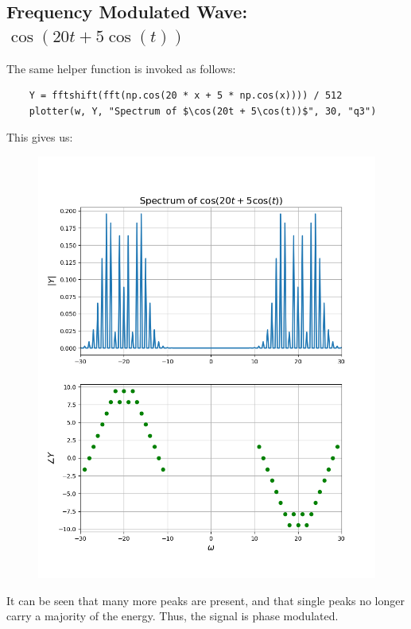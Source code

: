 \documentclass[12pt, a4paper]{article}
\begin{document}
\subsection{Frequency Modulated Wave: $\cos(20t + 5\cos(t))$}
The same helper function is invoked as follows:
\begin{lstlisting}
    Y = fftshift(fft(np.cos(20 * x + 5 * np.cos(x)))) / 512
    plotter(w, Y, "Spectrum of $\cos(20t + 5\cos(t))$", 30, "q3")
\end{lstlisting}
This gives us:
\begin{figure}[H]
    \centering
    \includegraphics[scale=0.6]{q3.png}
\end{figure}
It can be seen that many more peaks are present, and that single peaks no longer carry a majority of the energy.
Thus, the signal is phase modulated.
\end{document}
